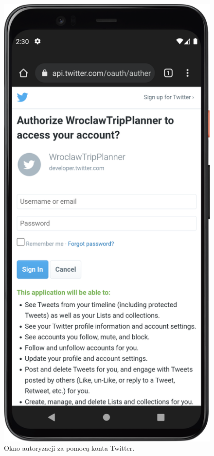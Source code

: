         \vspace{1cm}
        \begin{figure}[!ht]%
            \centering
            \includegraphics[scale=0.15]{src/app/twitter_login.png}
            \caption{Okno autoryzacji za pomocą konta Twitter.\label{twitter}}
            \qquad
        \end{figure} 